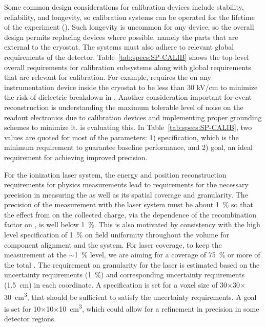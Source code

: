 Some common design considerations for calibration devices include stability, reliability, and longevity, so calibration systems can be operated for the lifetime of the experiment (\dunelifetime). Such longevity is uncommon for any device, so the overall design permits replacing devices where possible, namely the parts that are external to the cryostat. The systems must also adhere to relevant global requirements of the  detector. Table~\ref{tab:specs:SP-CALIB} shows the top-level overall requirements for calibration subsystems along with global  requirements that are relevant for calibration. For example,  requires the \efield  on any instrumentation device inside the cryostat to be less than 30 kV/cm to minimize the risk of dielectric breakdown in . Another consideration important for event reconstruction is understanding the maximum tolerable level of noise on the readout electronics due to calibration devices and implementing proper grounding schemes to minimize it. 
 is evaluating this. In Table~\ref{tab:specs:SP-CALIB}, two values are quoted for most of the parameters: 1) specification, which is the minimum requirement to guarantee baseline performance, and 2) goal, an ideal requirement %
for achieving improved precision.

For the ionization laser system, the energy and position reconstruction requirements for physics measurements lead to requirements for the necessary precision in measuring the  \efield as well as its spatial coverage and granularity. The precision of the \efield measurement with the laser system must be about \SI{1}{\%} so that the effect from \efield on the collected charge, via the dependence of the recombination factor on \efield, is well below \SI{1}{\%}. This is also motivated by consistency with the high level  specification of \SI{1}{\%} on field uniformity throughout the volume for component alignment and the  system. For laser coverage, to keep the \efield measurement at the $\sim$\SI{1}{\%} level, we are aiming for a coverage of \SI{75}{\%} or more of the total . The requirement on granularity for the laser is estimated based on the  uncertainty requirements (\SI{1}{\%}) and corresponding uncertainty requirements (\SI{1.5}{\cm}) in each coordinate. A specification is set for a voxel size of \num{30}$\times$\num{30}$\times$\SI{30}{\cubic\cm}, that should be sufficient to satisfy the  uncertainty requirements. A goal is set for \num{10}$\times$\num{10}$\times$\SI{10}{\cubic\cm}, which could allow for a refinement in precision in some detector regions. 

